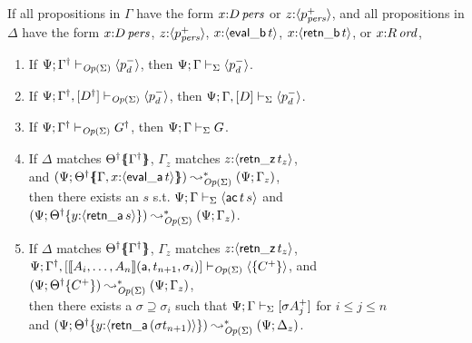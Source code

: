 \begin{theorem}\label{thm:opersound}
If all propositions in $\Gamma$ have the form 
$x{:}{D}\,{{\it pers}}$ or $z{:}\langle {p^+_{{\it pers}}} \rangle$, and all propositions in 
$\Delta$ have the form $x{:}{D}\,{{\it pers}}$, $z{:}\langle {p^+_{{\it pers}}} \rangle$,
$x{:}\langle {{\sf eval\_b}\,t} \rangle$, $x{:}\langle {{\sf retn\_b}\,t} \rangle$, or
$x{:}{R}\,{{\it ord}}$, 
\begin{enumerate}
\item If ${\Psi}; {{{\Gamma}^\dag}} \vdash_{{\it Op}({\Sigma})} {\langle {p^-_d} \rangle}$,
then ${\Psi}; {\Gamma} \vdash_{\Sigma} {\langle {p^-_d} \rangle}$.
\item If ${\Psi}; {{{\Gamma}^\dag}, [{{D}^\dag}]} \vdash_{{\it Op}({\Sigma})} {\langle {p^-_d} \rangle}$, then ${\Psi}; {\Gamma, [D]} \vdash_{\Sigma} {\langle {p^-_d} \rangle}$.
\item If ${\Psi}; {{{\Gamma}^\dag}} \vdash_{{\it Op}({\Sigma})} {{{G}^\dag}}$, then
 ${\Psi}; {\Gamma} \vdash_{\Sigma} {G}$.
\item If $\Delta$ matches ${{{\Theta}^\dag}}\mbox{$\{\hspace{-4pt}\{$}{{{\Gamma}^\dag}}\mbox{$\}\hspace{-4pt}\}$}$,
$\Gamma_z$ matches $z{:}\langle {{\sf retn\_z}\,t_z} \rangle$, \\
and
$(\Psi; {{{\Theta}^\dag}}\mbox{$\{\hspace{-4pt}\{$}{{\Gamma},{x{:}\langle {{\sf eval\_a}\,t} \rangle}}\mbox{$\}\hspace{-4pt}\}$}) \leadsto^*_{{\it Op}({\Sigma})} (\Psi; \Gamma_z)$, \\
then there exists an $s$ s.t.
${\Psi}; {\Gamma} \vdash_{\Sigma} {\langle {{\sf ac}\,t\,s} \rangle}$ and
$(\Psi; {{{\Theta}^\dag}}\{{y{:}\langle {{\sf retn\_a}\,s} \rangle}\}) 
   \leadsto^*_{{\it Op}({\Sigma})}
 (\Psi; \Gamma_z)$.
\item If $\Delta$ matches ${{{\Theta}^\dag}}\mbox{$\{\hspace{-4pt}\{$}{{{\Gamma}^\dag}}\mbox{$\}\hspace{-4pt}\}$}$,
$\Gamma_z$ matches $z{:}\langle {{\sf retn\_z}\,t_z} \rangle$, \\
${\Psi}; {{{\Gamma}^\dag}, [\llbracket {A_i,\ldots,A_n} \rrbracket({\sf a},{t_{n+1}},{\sigma_i})]} \vdash_{{\it Op}({\Sigma})} {\langle {\{C^+\}} \rangle}{}$, and 
$(\Psi; {{{\Theta}^\dag}}\{{C^+}\})
         \leadsto^*_{{\it Op}({\Sigma})}
       (\Psi; \Gamma_z)$, \\
then there exists a $\sigma \supseteq \sigma_i$ such that 
${\Psi}; {\Gamma} \vdash_{\Sigma} {[{\sigma}A^+_j]}$ for $i \leq j \leq n$\\
and 
$(\Psi; {{{\Theta}^\dag}}\{{y{:}\langle {{\sf retn\_a}\,(\sigma t_{n+1})} \rangle}\})
  \leadsto^*_{{\it Op}({\Sigma})}
 (\Psi; \Delta_z)$. 
\end{enumerate}
\end{theorem}

